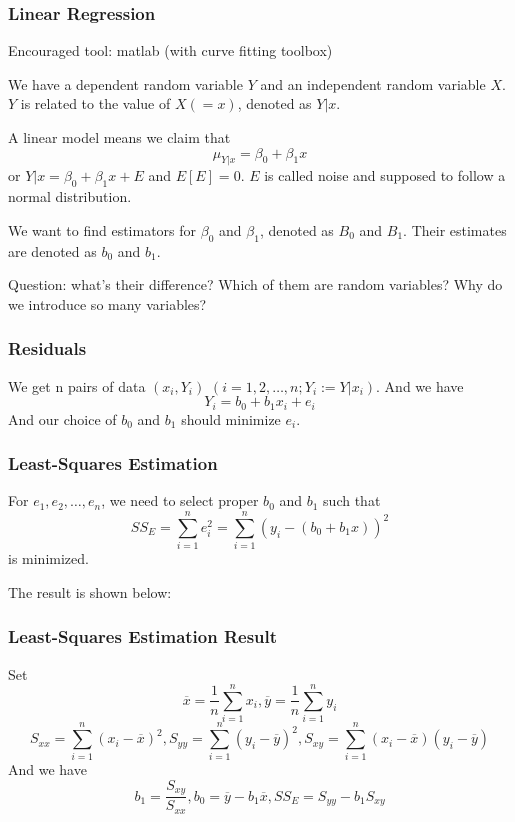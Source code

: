\documentclass{beamer}
\begin{document}
\begin{frame}
    \frametitle{Linear Regression}

    Encouraged tool: matlab (with curve fitting toolbox)\par
    \vspace{0.3cm}
    We have a dependent random variable $Y$ and an independent random variable $X$. $Y$ is related to the value of $X(=x)$, denoted as $Y|x$.\par
    A linear model means we claim that
    \[\mu_{Y|x}=\beta_0+\beta_1 x\]
    or $Y|x = \beta_0+\beta_1 x +E$ and $E[E]=0$. $E$ is called noise and supposed to follow a normal distribution.\par
    We want to find estimators for $\beta_0$ and $\beta_1$, denoted as $B_0$ and $B_1$. Their estimates are denoted as $b_0$ and $b_1$. \par
    Question: what's their difference? Which of them are random variables? Why do we introduce so many variables?

\end{frame}

\begin{frame}
    \frametitle{Residuals}

    We get n pairs of data $(x_i, Y_i)$ $(i=1,2,\dots , n; Y_i:=Y|x_i)$. And we have 
    \[Y_i=b_0+b_1 x_i+e_i\]
    And our choice of $b_0$ and $b_1$ should minimize $e_i$.

\end{frame}

\begin{frame}
    \frametitle{Least-Squares Estimation}

    For $e_1, e_2, \dots , e_n$, we need to select proper $b_0$ and $b_1$ such that 
    \[SS_{E}=\sum\limits_{i=1}^{n} e_i^2=\sum\limits_{i=1}^{n} (y_i-(b_0+b_1 x))^2\]
    is minimized.\par
    The result is shown below:

\end{frame}

\begin{frame}
    \frametitle{Least-Squares Estimation Result}

    Set 
    \[\overline{x}=\frac{1}{n} \sum\limits_{i=1}^{n} x_i, \overline{y}=\frac{1}{n} \sum\limits_{i=1}^{n} y_i\]
    \[S_{xx}=\sum\limits_{i=1}^{n}(x_i-\overline{x})^2, S_{yy}=\sum\limits_{i=1}^{n}(y_i-\overline{y})^2, S_{xy}=\sum\limits_{i=1}^{n}(x_i-\overline{x})(y_i-\overline{y})\]
    And we have 
    \[b_1=\frac{S_{xy}}{S_{xx}}, b_0=\overline{y}-b_1 \overline{x}, SS_E=S_{yy}-b_1 S_{xy}\]

\end{frame}
\end{document}

